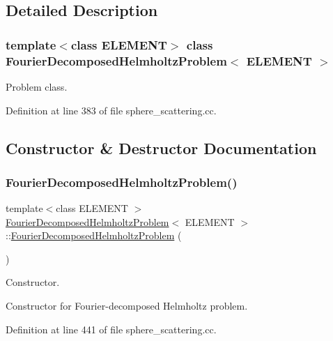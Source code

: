 \subsection{Detailed Description}
\subsubsection*{template$<$class E\+L\+E\+M\+E\+NT$>$\newline
class Fourier\+Decomposed\+Helmholtz\+Problem$<$ E\+L\+E\+M\+E\+N\+T $>$}

Problem class. 

Definition at line 383 of file sphere\+\_\+scattering.\+cc.



\subsection{Constructor \& Destructor Documentation}
\mbox{\label{classFourierDecomposedHelmholtzProblem_ab368ed8fe04d4e3db67d13bab9e7b52e}} 
\subsubsection{\texorpdfstring{Fourier\+Decomposed\+Helmholtz\+Problem()}{FourierDecomposedHelmholtzProblem()}\hspace{0.1cm}{\footnotesize\ttfamily [1/2]}}
{\footnotesize\ttfamily template$<$class E\+L\+E\+M\+E\+NT $>$ \\
\hyperlink{classFourierDecomposedHelmholtzProblem}{Fourier\+Decomposed\+Helmholtz\+Problem}$<$ E\+L\+E\+M\+E\+NT $>$\+::\hyperlink{classFourierDecomposedHelmholtzProblem}{Fourier\+Decomposed\+Helmholtz\+Problem} (\begin{DoxyParamCaption}{ }\end{DoxyParamCaption})}



Constructor. 

Constructor for Fourier-\/decomposed Helmholtz problem. 

Definition at line 441 of file sphere\+\_\+scattering.\+cc.



